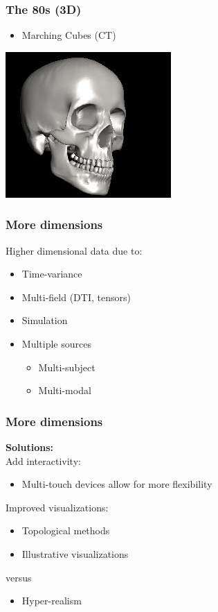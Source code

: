 \documentclass{beamer}
\begin{document}
\begin{frame}
	\frametitle{The 80s (3D)}
	\begin{itemize}
		\item Marching Cubes (CT)
	\end{itemize}
	\begin{center}
		\includegraphics[width=.4\textwidth,height=.4\textheight]{images/marching}
	\end{center}
\end{frame}

\begin{frame}
	\frametitle{More dimensions}
	Higher dimensional data due to:
	\begin{itemize}
		\item Time-variance
		\item Multi-field (DTI, tensors)
		\item Simulation
		\item Multiple sources
			\begin{itemize}
				\item Multi-subject
				\item Multi-modal
			\end{itemize}
	\end{itemize}
\end{frame}

\begin{frame}
	\frametitle{More dimensions}
	\textbf{Solutions:}\\
	Add interactivity:
	\begin{itemize}
		\item Multi-touch devices allow for more flexibility
	\end{itemize}
	Improved visualizations:\\
	\begin{itemize}
		\item Topological methods
		\item Illustrative visualizations
	\end{itemize}
	versus
	\begin{itemize}
		\item Hyper-realism
	\end{itemize}
\end{frame}
\end{document}
